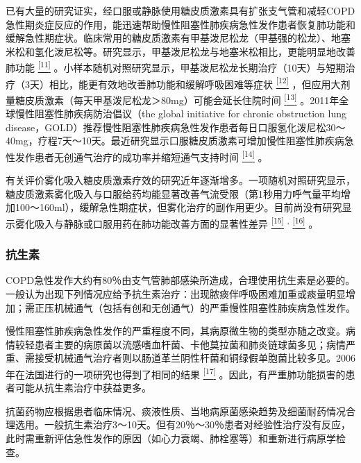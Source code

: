 已有大量的研究证实，经口服或静脉使用糖皮质激素具有扩张支气管和减轻COPD急性期炎症反应的作用，能迅速帮助慢性阻塞性肺疾病急性发作患者恢复肺功能和缓解急性期症状。临床常用的糖皮质激素有甲基泼尼松龙（甲基强的松龙）、地塞米松和氢化泼尼松等。研究显示，甲基泼尼松龙与地塞米松相比，更能明显地改善肺功能
\protect\hyperlink{text00012.htmlux5cux23ch11-11}{\textsuperscript{{[}11{]}}}
。小样本随机对照研究显示，甲基泼尼松龙长期治疗（10天）与短期治疗（3天）相比，能更有效地改善肺功能和缓解呼吸困难等症状
\protect\hyperlink{text00012.htmlux5cux23ch12-11}{\textsuperscript{{[}12{]}}}
，但应用大剂量糖皮质激素（每天甲基泼尼松龙＞80mg）可能会延长住院时间
\protect\hyperlink{text00012.htmlux5cux23ch13-11}{\textsuperscript{{[}13{]}}}
。2011年全球慢性阻塞性肺疾病防治倡议（the global initiative for chronic
obstruction lung
disease，GOLD）推荐慢性阻塞性肺疾病急性发作患者每日口服氢化泼尼松30～40mg，疗程7天～10天。最近研究显示口服糖皮质激素可增加慢性阻塞性肺疾病急性发作患者无创通气治疗的成功率并缩短通气支持时间
\protect\hyperlink{text00012.htmlux5cux23ch14-11}{\textsuperscript{{[}14{]}}}
。

有关评价雾化吸入糖皮质激素疗效的研究近年逐渐增多。一项随机对照研究显示，糖皮质激素雾化吸入与口服给药均能显著改善气流受限（第1秒用力呼气量平均增加100～160ml），缓解急性期症状，但雾化治疗的副作用更少。目前尚没有研究显示雾化吸入与静脉或口服用药在肺功能改善方面的显著性差异
\protect\hyperlink{text00012.htmlux5cux23ch15-11}{\textsuperscript{{[}15{]}}}
\textsuperscript{,}
\protect\hyperlink{text00012.htmlux5cux23ch16-11}{\textsuperscript{{[}16{]}}}
。

\subsubsection{抗生素}

COPD急性发作大约有80％由支气管肺部感染所造成，合理使用抗生素是必要的。一般认为出现下列情况应给予抗生素治疗：出现脓痰伴呼吸困难加重或痰量明显增加；需正压机械通气（包括有创和无创通气）的严重慢性阻塞性肺疾病急性发作。

慢性阻塞性肺疾病急性发作的严重程度不同，其病原微生物的类型亦随之改变。病情较轻患者主要的病原菌以流感嗜血杆菌、卡他莫拉菌和肺炎链球菌多见；病情严重、需接受机械通气治疗者则以肠道革兰阴性杆菌和铜绿假单胞菌比较多见。2006年在法国进行的一项研究也得到了相同的结果
\protect\hyperlink{text00012.htmlux5cux23ch17-11}{\textsuperscript{{[}17{]}}}
。因此，有严重肺功能损害的患者可能从抗生素治疗中获益更多。

抗菌药物应根据患者临床情况、痰液性质、当地病原菌感染趋势及细菌耐药情况合理选用。一般抗生素治疗3～10天。但有20％～30％患者对经验性治疗没有反应，此时需重新评估急性发作的原因（如心力衰竭、肺栓塞等）和重新进行病原学检查。

